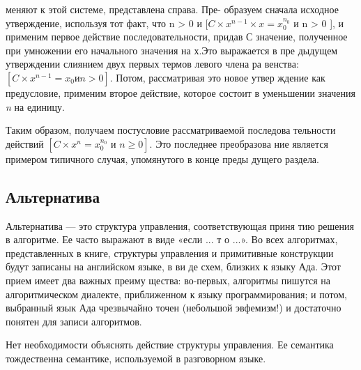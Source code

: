 \noindent меняют к этой системе, представлена справа. Пре­-\linebreak
образуем сначала исходное утверждение, используя тот 
факт, что 
\noindent n > 0 и \textit{$[C\times x^{n-1} \times x = x_{0}^{n_{0}}$} и n > 0 ], и применим
первое  действие  последовательности, придав С значение, полученное 
при умножении его начального значения на х.Это выражается в пре­
дыдущем утверждении слиянием двух первых термов левого члена ра­
венства:\textit{$[C\times x^{n-1} = x_{0} и n > 0]$}. Потом, рассматривая это новое утвер­
ждение как  предусловие,  применим  второе действие, которое состоит 
в уменьшении значения \textit{n} на единицу.

Таким образом, получаем постусловие  рассматриваемой последова­
тельности действий \textit{$[C\times x^{n} = x_{0}^{n_{0}} \textit{ и } n \geqslant 0]$}. Это последнее преобразова­
ние является примером типичного случая, упомянутого в конце преды­
дущего раздела.

\subsection{Альтернатива}
\noindent Альтернатива — это структура управления,  соответствующая  приня­
тию решения в алгоритме. Ее часто выражают в виде «если ...  т о  ...». 
Во всех алгоритмах, представленных в книге, структуры управления и 
примитивные конструкции будут записаны на английском языке, в ви­
де схем, близких к языку Ада.  Этот прием имеет два важных преиму­
щества: во-первых, алгоритмы пишутся на алгоритмическом диалекте, 
приближенном к языку  программирования; и потом,  выбранный язык 
Ада чрезвычайно точен  (небольшой эвфемизм!)  и достаточно понятен 
для записи алгоритмов.

Нет необходимости объяснять действие структуры  управления.  Ее 
семантика тождественна семантике, используемой в разговорном языке.
\newline
\pagebreak

